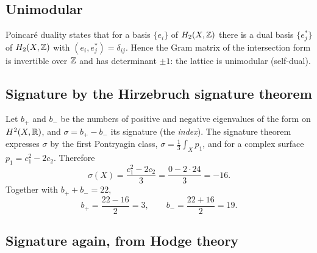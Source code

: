\subsection{Unimodular}

Poincaré duality states that for a basis $\{e_i\}$ of $H_2(X,\mathbb{Z})$ there is a dual basis
$\{e_j^*\}$ of $H_2(X,\mathbb{Z})$ with $(e_i,e^*_j)=\delta_{ij}$. Hence the Gram matrix of the
intersection form is invertible over $\mathbb{Z}$ and has determinant $\pm1$: the lattice is
unimodular (self-dual). 

\subsection{Signature by the Hirzebruch signature theorem}

Let $b_+$ and $b_-$ be the numbers of positive and negative eigenvalues of the form on
$H^2(X,\mathbb{R})$, and $\sigma=b_+-b_-$ its signature (the \emph{index}). The signature theorem
expresses $\sigma$ by the first Pontryagin class, $\sigma=\frac13\int_Xp_1$, and for a complex
surface $p_1=c_1^2-2c_2$. Therefore
\begin{equation}\label{eq:k3:hirzebruch}
  \sigma(X)=\frac{c_1^2-2c_2}{3}=\frac{0-2\cdot24}{3}=-16 .
\end{equation}
 Together with $b_++b_-=22$,
\begin{equation}\label{eq:k3:319}
  b_+=\frac{22-16}{2}=3,\qquad b_-=\frac{22+16}{2}=19 .
\end{equation}

\subsection{Signature again, from Hodge theory}

